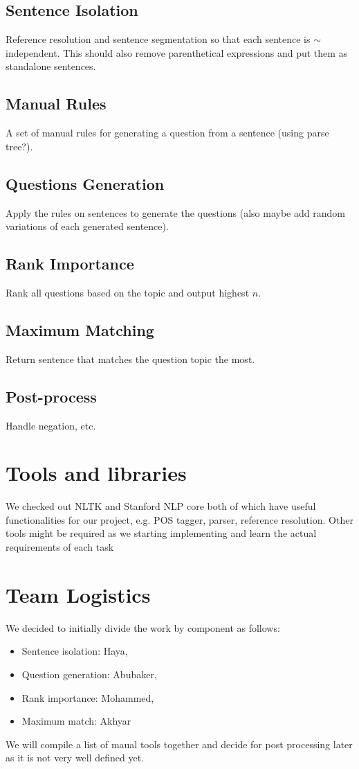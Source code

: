 \documentclass{article}
\begin{document}
    \subsection{Sentence Isolation}
    Reference resolution and sentence segmentation so that each sentence is $\sim$independent. This
    should also remove parenthetical expressions and put them as standalone sentences.
    \subsection{Manual Rules}
    A set of manual rules for generating a question from a sentence (using parse tree?).
    \subsection{Questions Generation}
    Apply the rules on sentences to generate the questions (also maybe add random variations of each
    generated sentence).
    \subsection{Rank Importance}
    Rank all questions based on the topic and output highest $n$.
    \subsection{Maximum Matching}
    Return sentence that matches the question topic the most.
    \subsection{Post-process}
    Handle negation, etc.
    \section{Tools and libraries}
    We checked out NLTK and Stanford NLP core both of which have useful functionalities for our
    project, e.g. POS tagger, parser, reference resolution. Other tools might be required as we
    starting implementing and learn the actual requirements of each task
    \section{Team Logistics}
    We decided to initially divide the work by component as follows:
    \begin{itemize}
        \item Sentence isolation: Haya,
        \item Question generation: Abubaker,
        \item Rank importance: Mohammed,
        \item Maximum match: Akhyar
    \end{itemize}
    We will compile a list of maual tools together and decide for post processing later as it is not
    very well defined yet.
    
\end{document}
